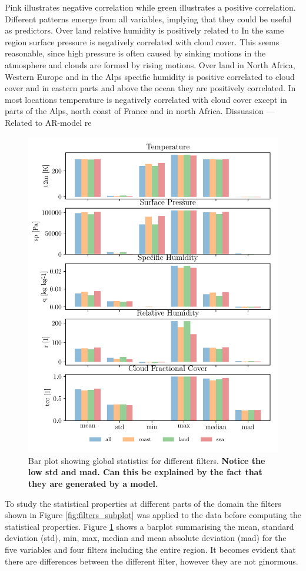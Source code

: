 Pink illustrates negative correlation while green illustrates a positive correlation. Different patterns emerge from all variables, implying that they could be useful as predictors. Over land relative humidity is positively related to 
In the same region surface pressure is negatively correlated with cloud cover. This seems reasonable, since high pressure is often caused by sinking motions in the atmosphere and clouds are formed by rising motions. Over land in North Africa, Western Europe and in the Alps specific humidity is positive correlated to cloud cover and in eastern parts and above the ocean they are positively correlated. In most locations temperature is negatively correlated with cloud cover except in parts of the Alps, north coast of France and in north Africa. 
Dissuasion  --- Related to AR-model re

\begin{figure}[ht]
    \centering
    \includegraphics{python_figs/bar_plot_global_statistics_new_legend.pdf}
    \caption{Bar plot showing global statistics for different filters. \textbf{Notice the low std and mad. Can this be explained by the fact that they are generated by a model.}}
    \label{fig:bar_plot_global_stats}
\end{figure}
To study the statistical properties at different parts of the domain the filters shown in Figure \ref{fig:filters_subplot} was applied to the data before computing the statistical properties. Figure \ref{fig:bar_plot_global_stats} shows a barplot summarising the mean, standard deviation (std), min, max, median and mean absolute deviation (mad) for the five variables and four filters including the entire region. It becomes evident that there are differences between the different filter, however they are not ginormous.

